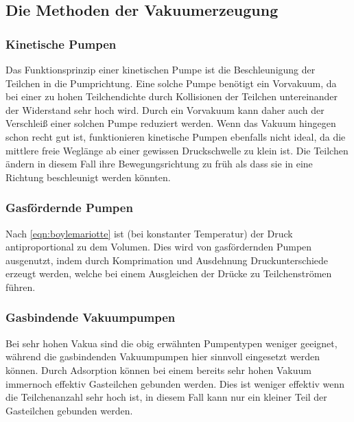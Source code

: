 \subsection{Die Methoden der Vakuumerzeugung}

\subsubsection*{Kinetische Pumpen}
Das Funktionsprinzip einer kinetischen Pumpe ist die Beschleunigung der Teilchen in
die Pumprichtung. Eine solche Pumpe benötigt ein Vorvakuum, da bei einer zu hohen
Teilchendichte durch Kollisionen der Teilchen untereinander der Widerstand sehr hoch wird.
Durch ein Vorvakuum kann daher auch der Verschleiß einer solchen Pumpe reduziert werden.
Wenn das Vakuum hingegen schon recht gut ist, funktionieren kinetische Pumpen ebenfalls nicht
ideal, da die mittlere freie Weglänge ab einer gewissen Druckschwelle zu klein ist.
Die Teilchen ändern in diesem Fall ihre Bewegungsrichtung zu früh als dass sie in eine Richtung
beschleunigt werden könnten.

\subsubsection*{Gasfördernde Pumpen}
Nach \ref{eqn:boylemariotte} ist (bei konstanter Temperatur) der Druck
antiproportional zu dem Volumen. Dies wird von gasfördernden Pumpen ausgenutzt,
indem durch Komprimation und Ausdehnung Druckunterschiede erzeugt werden, welche
bei einem Ausgleichen der Drücke zu Teilchenströmen führen.

\subsubsection*{Gasbindende Vakuumpumpen}
Bei sehr hohen Vakua sind die obig erwähnten Pumpentypen weniger geeignet,
während die gasbindenden Vakuumpumpen hier sinnvoll eingesetzt werden können.
Durch Adsorption können bei einem bereits sehr hohen Vakuum immernoch effektiv
Gasteilchen gebunden werden. Dies ist weniger effektiv wenn die Teilchenanzahl sehr hoch ist,
in diesem Fall kann nur ein kleiner Teil der Gasteilchen gebunden werden.

